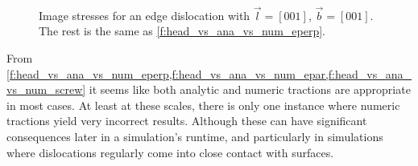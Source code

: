 \documentclass[11pt]{iopart}
\begin{document}
\begin{figure}
    ~
    ~
    \caption{Image stresses for an edge dislocation with $\vec{l} = [0 0 1]$, $\vec{b} = [0 0 1]$. The rest is the same as \cref{f:head_vs_ana_vs_num_eperp}.}
    \label{f:head_vs_ana_vs_num_screw}
\end{figure}

From \cref{f:head_vs_ana_vs_num_eperp,f:head_vs_ana_vs_num_epar,f:head_vs_ana_vs_num_screw} it seems
like both analytic and numeric tractions are appropriate in most cases. At least at these scales, there is only one instance where numeric tractions yield very incorrect results. Although these can have significant consequences later in a simulation's runtime, and particularly in simulations where dislocations regularly come into close contact with surfaces.
\end{document}
